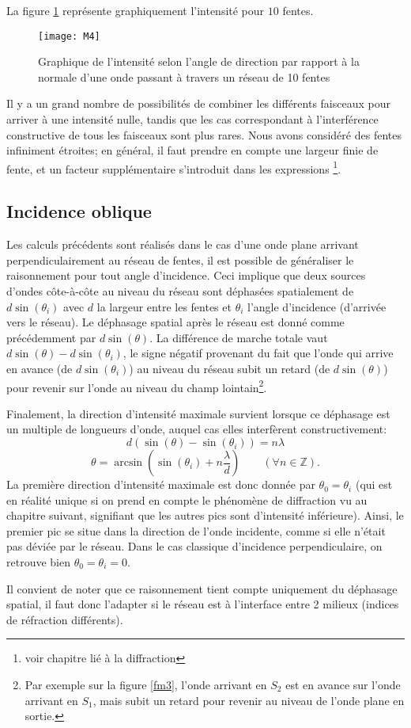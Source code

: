 La figure \ref{M4} représente graphiquement l'intensité pour $10$ fentes.
\begin{figure}[htb]
\centering
\texttt{[image: M4]}
\caption{Graphique de l'intensité selon l'angle de direction par rapport à la normale d'une onde passant à travers un réseau de 10 fentes }
\label{M4}
\end{figure}

Il y a un grand nombre de possibilités de combiner les différents faisceaux pour arriver à une intensité nulle, tandis que les cas correspondant à l'interférence constructive de tous les faisceaux sont plus rares. Nous avons considéré des fentes infiniment étroites; en général, il faut prendre en compte une largeur finie de fente, et un facteur supplémentaire s'introduit dans les expressions \footnote{voir chapitre lié à la diffraction}.


\subsection{Incidence oblique}

Les calculs précédents sont réalisés dans le cas d'une onde plane arrivant perpendiculairement au réseau de fentes, il est possible de généraliser le raisonnement pour tout angle d'incidence. Ceci implique que deux sources d'ondes côte-à-côte au niveau du réseau sont déphasées spatialement de $d\sin(\theta_i)$ avec $d$ la largeur entre les fentes et $\theta_i$ l'angle d'incidence (d'arrivée vers le réseau). Le déphasage spatial après le réseau est donné comme précédemment par $d\sin(\theta)$. La différence de marche totale vaut $d\sin(\theta) - d\sin(\theta_i)$, le signe négatif provenant du fait que l'onde qui arrive en avance (de $d\sin(\theta_i)$) au niveau du réseau subit un retard (de $d\sin(\theta)$) pour revenir sur l'onde au niveau du champ lointain\footnote{Par exemple sur la figure \ref{fm3}, l'onde arrivant en $S_2$ est en avance sur l'onde arrivant en $S_1$, mais subit un retard pour revenir au niveau de l'onde plane en sortie.}.

Finalement, la direction d'intensité maximale survient lorsque ce déphasage est un multiple de longueurs d'onde, auquel cas elles interfèrent constructivement:
$$
  d(\sin(\theta) - \sin(\theta_i))=n\lambda
$$
$$\theta = \arcsin\left(\sin(\theta_i) + n\frac{\lambda}{d}\right)  \qquad(\forall n\in  \mathbb{Z}).
$$
La première direction d'intensité maximale est donc donnée par $\theta_0 = \theta_i$ (qui est en réalité unique si on prend en compte le phénomène de diffraction vu au chapitre suivant, signifiant que les autres pics sont d'intensité inférieure). Ainsi, le premier pic se situe dans la direction de l'onde incidente, comme si elle n'était pas déviée par le réseau.
Dans le cas classique d'incidence perpendiculaire, on retrouve bien $\theta_0 = \theta_i = 0$.

Il convient de noter que ce raisonnement tient compte uniquement du déphasage spatial, il faut donc l'adapter si le réseau est à l'interface entre 2 milieux (indices de réfraction différents).